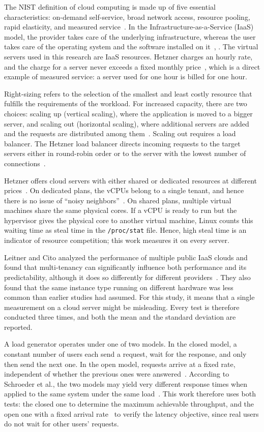 \documentclass[conference,a4paper]{IEEEtran}
\begin{document}
The NIST definition of cloud computing is made up of five essential characteristics: on-demand self-service, broad network access, resource pooling, rapid elasticity, and measured service~\cite{nist}. In the Infrastructure-as-a-Service (IaaS) model, the provider takes care of the underlying infrastructure, whereas the user takes care of the operating system and the software installed on it~\cite{nist}, \cite{west}. The virtual servers used in this research are IaaS resources. Hetzner charges an hourly rate, and the charge for a server never exceeds a fixed monthly price~\cite{hz-ccx}, which is a direct example of measured service: a server used for one hour is billed for one hour.

Right-sizing refers to the selection of the smallest and least costly resource that fulfills the requirements of the workload. For increased capacity, there are two choices: scaling up (vertical scaling), where the application is moved to a bigger server, and scaling out (horizontal scaling), where additional servers are added and the requests are distributed among them~\cite{west}. Scaling out requires a load balancer. The Hetzner load balancer directs incoming requests to the target servers either in round-robin order or to the server with the lowest number of connections~\cite{hz-lb}.

Hetzner offers cloud servers with either shared or dedicated resources at different prices~\cite{hz-servers}. On dedicated plans, the vCPUs belong to a single tenant, and hence there is no issue of ``noisy neighbors''~\cite{hz-ccx}. On shared plans, multiple virtual machines share the same physical cores. If a vCPU is ready to run but the hypervisor gives the physical core to another virtual machine, Linux counts this waiting time as steal time in the \texttt{/proc/stat} file. Hence, high steal time is an indicator of resource competition; this work measures it on every server.

Leitner and Cito analyzed the performance of multiple public IaaS clouds and found that multi-tenancy can significantly influence both performance and its predictability, although it does so differently for different providers~\cite{leitner}. They also found that the same instance type running on different hardware was less common than earlier studies had assumed. For this study, it means that a single measurement on a cloud server might be misleading. Every test is therefore conducted three times, and both the mean and the standard deviation are reported.

A load generator operates under one of two models. In the closed model, a constant number of users each send a request, wait for the response, and only then send the next one. In the open model, requests arrive at a fixed rate, independent of whether the previous ones were answered~\cite{k6-open}. According to Schroeder et al., the two models may yield very different response times when applied to the same system under the same load~\cite{schroeder}. This work therefore uses both tests: the closed one to determine the maximum achievable throughput, and the open one with a fixed arrival rate~\cite{k6-car} to verify the latency objective, since real users do not wait for other users' requests.
\end{document}
